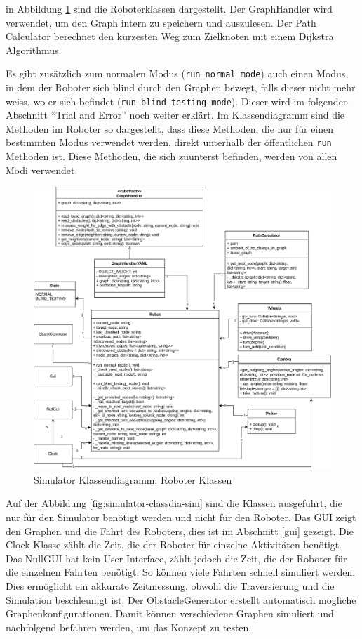 in Abbildung \ref{fig:simulator-classdia-robot} sind die Roboterklassen dargestellt. Der GraphHandler wird verwendet, um den Graph intern zu speichern und auszulesen. Der Path Calculator berechnet den kürzesten Weg zum Zielknoten mit einem Dijkstra Algorithmus.

Es gibt zusätzlich zum normalen Modus (\verb|run_normal_mode|) auch einen Modus, in dem der Roboter sich blind durch den Graphen bewegt, falls dieser nicht mehr weiss, wo er sich befindet (\verb|run_blind_testing_mode|). Dieser wird im folgenden Abschnitt ``Trial and Error'' noch weiter erklärt. Im Klassendiagramm sind die Methoden im Roboter so dargestellt, dass diese Methoden, die nur für einen bestimmten Modus verwendet werden, direkt unterhalb der öffentlichen \verb|run| Methoden ist. Diese Methoden, die sich zuunterst befinden, werden von allen Modi verwendet. 

\begin{figure}[H]
\centering
\includegraphics[width=\textwidth]{assets/informatik-prototyp/simulator/simulator-robot-erd.png}
\caption{Simulator Klassendiagramm: Roboter Klassen}
\label{fig:simulator-classdia-robot}
\end{figure}

Auf der Abbildung \ref{fig:simulator-classdia-sim} sind die Klassen ausgeführt, die nur für den Simulator benötigt werden und nicht für den Roboter. Das GUI zeigt den Graphen und die Fahrt des Roboters, dies ist im Abschnitt \ref{gui} gezeigt. Die Clock Klasse zählt die Zeit, die der Roboter für einzelne Aktivitäten benötigt. Das NullGUI hat kein User Interface, zählt jedoch die Zeit, die der Roboter für die einzelnen Fahrten benötigt. So können viele Fahrten schnell simuliert werden. Dies ermöglicht ein akkurate Zeitmessung, obwohl die Traversierung und die Simulation beschleunigt ist. Der ObstacleGenerator erstellt automatisch mögliche Graphenkonfigurationen. Damit können verschiedene Graphen simuliert und nachfolgend befahren werden, um das Konzept zu testen.

